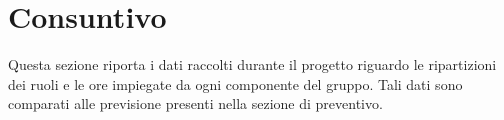 \section{Consuntivo}
Questa sezione riporta i dati raccolti durante il progetto riguardo le ripartizioni dei ruoli e le ore impiegate da ogni componente del gruppo. Tali dati sono comparati alle previsione presenti nella sezione di preventivo.